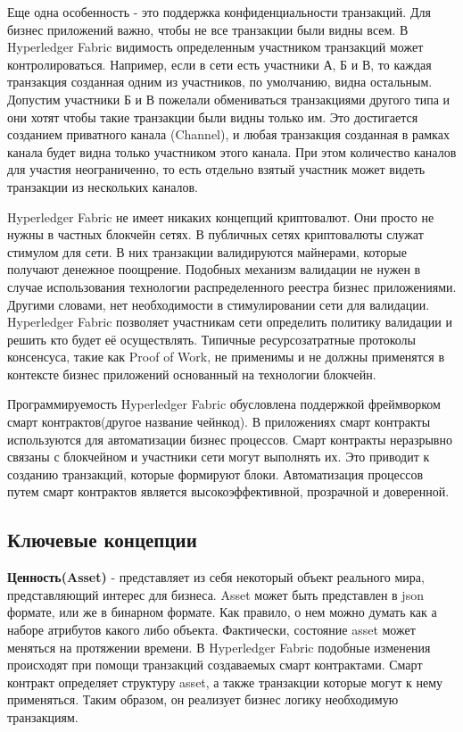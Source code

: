 Еще одна особенность - это поддержка конфиденциальности транзакций. Для бизнес приложений важно, чтобы не все транзакции были видны всем. В Hyperledger Fabric видимость определенным участником транзакций может контролироваться. Например, если в сети есть участники А, Б и В, то каждая транзакция созданная одним из участников, по умолчанию, видна остальным. Допустим участники Б и В пожелали обмениваться транзакциями другого типа и они хотят чтобы такие транзакции были видны только им. Это достигается созданием приватного канала (Channel), и любая транзакция созданная в рамках канала будет видна только участником этого канала. При этом количество каналов для участия неограниченно, то есть отдельно взятый участник может видеть транзакции из нескольких каналов.

Hyperledger Fabric не имеет никаких концепций криптовалют. Они просто не нужны в частных блокчейн сетях. В публичных сетях криптовалюты служат стимулом для сети. В них транзакции валидируются майнерами, которые получают денежное поощрение. Подобных механизм валидации не нужен в случае использования технологии распределенного реестра бизнес приложениями. Другими словами, нет необходимости в стимулировании сети для валидации. Hyperledger Fabric позволяет участникам сети определить политику валидации и решить кто будет её осуществлять. Типичные ресурсозатратные протоколы консенсуса, такие как Proof of Work\cite{pow}, не применимы и не должны применятся в контексте бизнес приложений основанный на технологии блокчейн. 

Программируемость Hyperledger Fabric обусловлена поддержкой фреймворком смарт контрактов(другое название чейнкод). В приложениях смарт контракты используются для автоматизации бизнес процессов. Смарт контракты неразрывно связаны с блокчейном и участники сети могут выполнять их. Это приводит к созданию транзакций, которые формируют блоки. Автоматизация процессов путем смарт контрактов является высокоэффективной, прозрачной и доверенной.

\subsection{Ключевые концепции} \label{subsec:ch1/sec3/subsec1}
\textbf{Ценность(Asset)} - представляет из себя некоторый объект реального мира, представляющий интерес для бизнеса. Asset может быть представлен в json формате, или же в бинарном формате. Как правило, о нем можно думать как а наборе атрибутов какого либо объекта. Фактически, состояние asset может меняться на протяжении времени. В Hyperledger Fabric подобные изменения происходят при помощи транзакций создаваемых смарт контрактами. Смарт контракт определяет структуру asset, а также транзакции которые могут к нему применяться. Таким образом, он реализует бизнес логику необходимую транзакциям.

